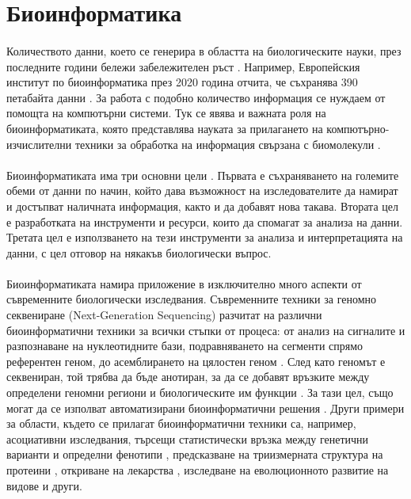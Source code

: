 \documentclass[pdftex,cyrillic,14pt,a4page,twoside,openright]{extreport}
\begin{document}
\section{Биоинформатика}
\paragraph{}
Количеството данни, което се генерира в областта на биологическите науки, през последните години бележи забележителен ръст \cite{marx2013}. Например, Европейския институт по биоинформатика през 2020 година отчита, че съхранява 390 петабайта данни \cite{embl2021}. За работа с подобно количество информация се нуждаем от помощта на компютърни системи. Тук се явява и важната роля на биоинформатиката, която представлява науката за прилагането на компютърно-изчислителни техники за обработка на информация свързана с биомолекули \cite{luscombe2001}.

\paragraph{}
Биоинформатиката има три основни цели \cite{luscombe2001}. Първата е съхраняването на големите обеми от данни по начин, който дава възможност на изследователите да намират и достъпват наличната информация, както и да добавят нова такава. Втората цел е разработката на инструменти и ресурси, които да спомагат за анализа на данни. Третата цел е използването на тези инструменти за анализа и интерпретацията на данни, с цел отговор на някакъв биологически въпрос.

\paragraph{}
Биоинформатиката намира приложение в изключително много аспекти от съвременните биологически изследвания. Съвременните техники за геномно секвениране (Next-Generation Sequencing) разчитат на различни биоинформатични техники за всички стъпки от процеса: от анализ на сигналите и разпознаване на нуклеотидните бази, подравняването на сегменти спрямо референтен геном, до асемблирането на цялостен геном \cite{oliver2015}. След като геномът е секвениран, той трябва да бъде анотиран, за да се добавят връзките между определени геномни региони и биологическите им функции \cite{aken2016}. За тази цел, също могат да се изполват автоматизирани биоинформатични решения \cite{curwen2004}. Други примери за области, където се прилагат биоинформатични техники са, например, асоциативни изследвания, търсещи статистически връзка между генетични варианти и определни фенотипи \cite{moore2010}, предсказване на триизмерната структура на протеини \cite{alphafold2021}, откриване на лекарства \cite{searls2000}, изследване на еволюционното развитие на видове \cite{diniz2017} и други.
\end{document}
